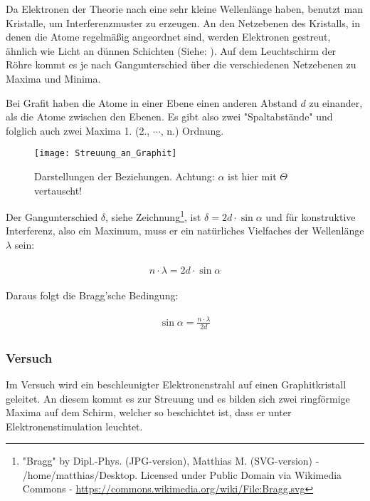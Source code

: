 Da Elektronen der Theorie nach eine sehr kleine Wellenlänge haben, benutzt man Kristalle, um Interferenzmuster zu erzeugen. An den Netzebenen des Kristalls, in denen die Atome regelmäßig angeordnet sind, werden Elektronen gestreut, ähnlich wie Licht an dünnen Schichten (Siehe: ). Auf dem Leuchtschirm der Röhre kommt es je nach Gangunterschied über die verschiedenen Netzebenen zu Maxima und Minima.

\begin{Wichtig}
	Bei Grafit haben die Atome in einer Ebene einen anderen Abstand $d$ zu einander, als die Atome zwischen den Ebenen. Es gibt also zwei "Spaltabstände" und folglich auch zwei Maxima 1. (2., $\cdots$, n.) Ordnung.
\end{Wichtig}

\begin{figure}[h!]
	\centering 
	\texttt{[image: Streuung\_an\_Graphit]}
	\caption{Darstellungen der Beziehungen. Achtung: $\alpha$ ist hier mit $\Theta$ vertauscht!}
	\label{fig:e-angrafit}
\end{figure}

Der Gangunterschied $\delta$, siehe Zeichnung\footnote{"Bragg" by Dipl.-Phys. (JPG-version), Matthias M. (SVG-version) - /home/matthias/Desktop. Licensed under Public Domain via Wikimedia Commons - \url{https://commons.wikimedia.org/wiki/File:Bragg.svg}}, ist $\delta = 2d \cdot \sin{\alpha}$ und für konstruktive Interferenz, also ein Maximum, muss er ein natürliches Vielfaches der Wellenlänge $\lambda$ sein:

\begin{align}
\begin{split}
	n \cdot \lambda = 2d \cdot \sin{\alpha}
\end{split}
\end{align}

\noindent Daraus folgt die Bragg'sche Bedingung:

\begin{align}
\begin{split}
	\sin{\alpha} = \frac{n \cdot \lambda}{2d}
\end{split}
\end{align}


\subsubsection{Versuch}

Im Versuch wird ein beschleunigter Elektronenstrahl auf einen Graphitkristall geleitet. An diesem kommt es zur Streuung und es bilden sich zwei ringförmige Maxima auf dem Schirm, welcher so beschichtet ist, dass er unter Elektronenstimulation leuchtet.


